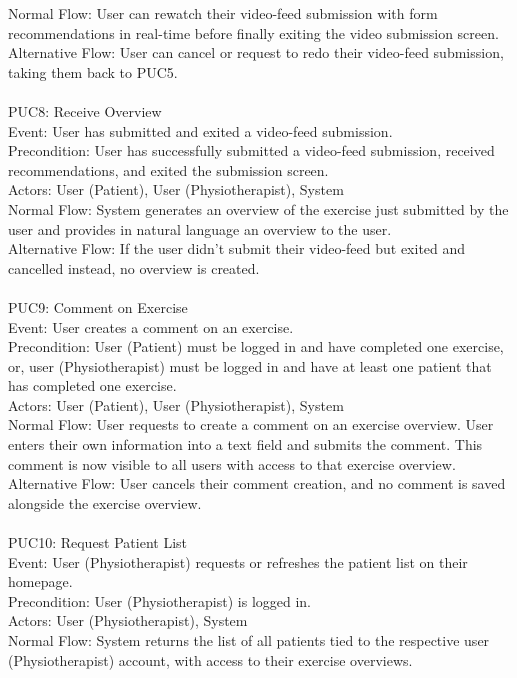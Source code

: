 \documentclass[12pt]{article}
\begin{document}
Normal Flow: User can rewatch their video-feed submission with form recommendations in real-time before finally exiting the video submission screen.\\
Alternative Flow: User can cancel or request to redo their video-feed submission, taking them back to PUC5.\\ \\
PUC8: Receive Overview\\
Event: User has submitted and exited a video-feed submission.\\
Precondition: User has successfully submitted a video-feed submission, received recommendations, and exited the submission screen.\\
Actors: User (Patient), User (Physiotherapist), System\\
Normal Flow: System generates an overview of the exercise just submitted by the user and provides in natural language an overview to the user.\\
Alternative Flow: If the user didn’t submit their video-feed but exited and cancelled instead, no overview is created.\\ \\
PUC9: Comment on Exercise\\
Event: User creates a comment on an exercise.\\
Precondition: User (Patient) must be logged in and have completed one exercise, or, user (Physiotherapist) must be logged in and have at least one patient that has completed one exercise.\\
Actors: User (Patient), User (Physiotherapist), System\\
Normal Flow: User requests to create a comment on an exercise overview. User enters their own information into a text field and submits the comment. This comment is now visible to all users with access to that exercise overview.\\
Alternative Flow: User cancels their comment creation, and no comment is saved alongside the exercise overview.\\ \\
PUC10: Request Patient List\\
Event: User (Physiotherapist) requests or refreshes the patient list on their homepage.\\
Precondition: User (Physiotherapist) is logged in.\\
Actors: User (Physiotherapist), System\\
Normal Flow: System returns the list of all patients tied to the respective user (Physiotherapist) account, with access to their exercise overviews.\\
\end{document}
